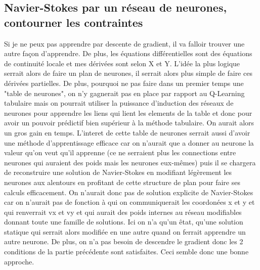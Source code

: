 \documentclass[12pt]{article}
\begin{document}
\subsection{Navier-Stokes par un réseau de neurones, contourner les contraintes}
Si je ne peux pas apprendre par descente de gradient, il va falloir trouver une autre façon d'apprendre. De plus, les équations différentielles sont des équations de continuité locale et mes dérivées sont selon X et Y. L'idée la plus logique serrait alors de faire un plan de neurones, il serrait alors plus simple de faire ces dérivées partielles. De plus, pourquoi ne pas faire dans un premier temps une "table de neurones", on n'y gagnerait pas en place par rapport au Q-Learning tabulaire mais on pourrait utiliser la puissance d'induction des réseaux de neurones pour apprendre les liens qui lient les elements de la table et donc pour avoir un pouvoir prédictif bien supérieur à la méthode tabulaire. On aurait alors un gros gain en temps. L'interet de cette table de neurones serrait aussi d'avoir une méthode d'apprentissage efficace car on n'aurait que a donner au neurone la valeur qu'on veut qu'il apprenne (ce ne serraient plus les connections entre neurones qui auraient des poids mais les neurones eux-mêmes) puis il se chargera de reconstruire une solution de Navier-Stokes en modifiant légèrement les neurones aux alentours en profitant de cette structure de plan pour faire ses calculs efficacement. On n'aurait donc pas de solution explicite de Navier-Stokes car on n'aurait pas de fonction à qui on communiquerait les coordonées x et y et qui renverrait vx et vy et qui aurait des poids internes au réseau modifiables donnant toute une famille de solutions. Ici on n'a qu'un êtat, qu'une solution statique qui serrait alors modifiée en une autre quand on ferrait apprendre un autre neurone. De plus, on n'a pas besoin de descendre le gradient donc les 2 conditions de la partie précédente sont satisfaites. Ceci semble donc une bonne approche.
\end{document}
